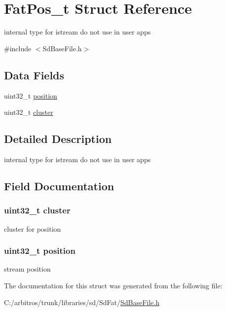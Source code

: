 \hypertarget{struct_fat_pos__t}{\section{Fat\-Pos\-\_\-t Struct Reference}
\label{struct_fat_pos__t}
}


internal type for istream do not use in user apps  




{\ttfamily \#include $<$Sd\-Base\-File.\-h$>$}

\subsection*{Data Fields}
\begin{DoxyCompactItemize}
\item 
uint32\-\_\-t \hyperlink{struct_fat_pos__t_ac66edcab862b65e1d49ce97f9c74690c}{position}
\item 
uint32\-\_\-t \hyperlink{struct_fat_pos__t_a5cc194a79520802c25787f3072f8fe5b}{cluster}
\end{DoxyCompactItemize}


\subsection{Detailed Description}
internal type for istream do not use in user apps 

\subsection{Field Documentation}
\hypertarget{struct_fat_pos__t_a5cc194a79520802c25787f3072f8fe5b}{
\subsubsection[{cluster}]{\setlength{\rightskip}{0pt plus 5cm}uint32\-\_\-t cluster}}\label{struct_fat_pos__t_a5cc194a79520802c25787f3072f8fe5b}
cluster for position \hypertarget{struct_fat_pos__t_ac66edcab862b65e1d49ce97f9c74690c}{
\subsubsection[{position}]{\setlength{\rightskip}{0pt plus 5cm}uint32\-\_\-t position}}\label{struct_fat_pos__t_ac66edcab862b65e1d49ce97f9c74690c}
stream position 

The documentation for this struct was generated from the following file\-:\begin{DoxyCompactItemize}
\item 
C\-:/arbitros/trunk/libraries/sd/\-Sd\-Fat/\hyperlink{_sd_base_file_8h}{Sd\-Base\-File.\-h}\end{DoxyCompactItemize}
